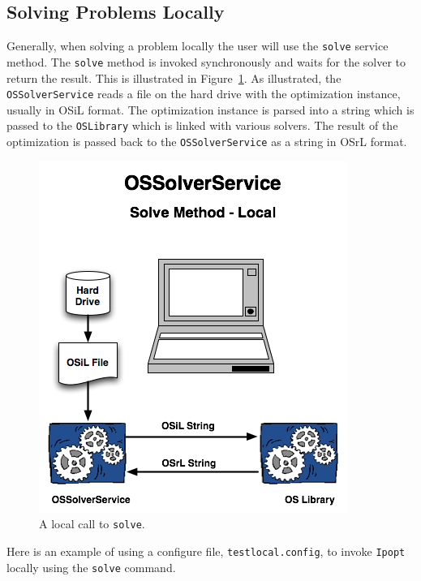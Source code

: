 \documentclass[11pt]{article}
\newcommand{\figurepath}{./figures}
\newcounter{Fig}
\renewcommand{\_}{{\char"5F}}
\renewcommand{\{}{{\char"7B}}
\renewcommand{\}}{{\char"7D}}
\renewcommand{\^}{{\char"0D}}
\renewcommand{\'}{{\char"0D}}
\begin{document}
\begin{enumerate}[Step 1:]
\subsection{Solving Problems Locally}

Generally, when solving a problem locally the user will use the {\tt solve} service method.
The {\tt solve} method is invoked synchronously and waits for the solver to return the result.  This is illustrated
in Figure~\ref{figure:ossolverservicelocal}. As illustrated, the {\tt OSSolverService} reads a file on the hard drive
with the optimization instance, usually in OSiL format. The optimization instance is parsed into a string
which is passed to the {\tt OSLibrary} which is linked with various solvers.
The result of the optimization is passed back to the {\tt OSSolverService} as a string in OSrL format.



\begin{figure}
\centering
\includegraphics[scale=0.5]{./figures/OSSolverServiceLocal.png}
\caption{A local call to {\tt solve}.}
\label{figure:ossolverservicelocal}
\end{figure}



Here is an example of using a configure file,  {\tt testlocal.config},
to invoke {\tt Ipopt} locally using the {\tt solve} command.


\end{enumerate}
\end{document}
